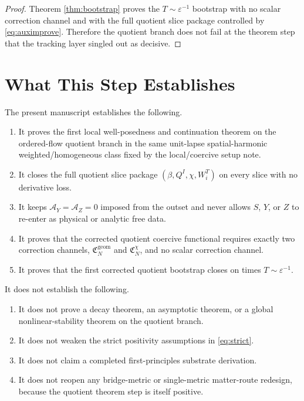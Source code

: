 \documentclass[11pt]{article}
\newcommand{\AY}{\mathcal A_Y}
\newcommand{\AZ}{\mathcal A_Z}
\begin{document}
\begin{proof}
Theorem \ref{thm:bootstrap} proves the \(T\sim\varepsilon^{-1}\) bootstrap with no scalar correction channel and with the full quotient slice package controlled by \eqref{eq:auximprove}. Therefore the quotient branch does not fail at the theorem step that the tracking layer singled out as decisive.
\end{proof}

\section{What This Step Establishes}

The present manuscript establishes the following.
\begin{enumerate}
    \item It proves the first local well-posedness and continuation theorem on the ordered-flow quotient branch in the same unit-lapse spatial-harmonic weighted/homogeneous class fixed by the local/coercive setup note.
    \item It closes the full quotient slice package \((\beta,Q^I,\chi,W_i^T)\) on every slice with no derivative loss.
    \item It keeps \(\AY=\AZ=0\) imposed from the outset and never allows \(S\), \(Y\), or \(Z\) to re-enter as physical or analytic free data.
    \item It proves that the corrected quotient coercive functional requires exactly two correction channels, \(\mathfrak C_N^{\mathrm{geom}}\) and \(\mathfrak C_N^\chi\), and no scalar correction channel.
    \item It proves that the first corrected quotient bootstrap closes on times \(T\sim\varepsilon^{-1}\).
\end{enumerate}

It does not establish the following.
\begin{enumerate}
    \item It does not prove a decay theorem, an asymptotic theorem, or a global nonlinear-stability theorem on the quotient branch.
    \item It does not weaken the strict positivity assumptions in \eqref{eq:strict}.
    \item It does not claim a completed first-principles substrate derivation.
    \item It does not reopen any bridge-metric or single-metric matter-route redesign, because the quotient theorem step is itself positive.
\end{enumerate}
\end{document}
